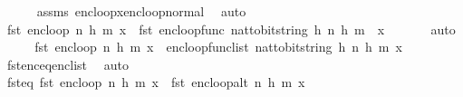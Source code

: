 \begin{isabellebody}
\ \ \ \ \isamarkupfalse%
\ assms\ enc{\isacharunderscore}{\kern0pt}loop{\isacharunderscore}{\kern0pt}x{\isacharunderscore}{\kern0pt}enc{\isacharunderscore}{\kern0pt}loop{\isacharunderscore}{\kern0pt}normal\ \isamarkupfalse%
\ auto\isanewline
\isanewline
\ \ \isamarkupfalse%
\ {\isachardoublequoteopen}fst\ {\isacharparenleft}{\kern0pt}enc{\isacharunderscore}{\kern0pt}loop\ {\isacharparenleft}{\kern0pt}n{\isacharcomma}{\kern0pt}\ h{\isacharcomma}{\kern0pt}\ m{\isacharparenright}{\kern0pt}\ x{\isacharparenright}{\kern0pt}\ {\isacharequal}{\kern0pt}\ fst\ {\isacharparenleft}{\kern0pt}enc{\isacharunderscore}{\kern0pt}loop{\isacharunderscore}{\kern0pt}func\ {\isacharparenleft}{\kern0pt}nat{\isacharunderscore}{\kern0pt}to{\isacharunderscore}{\kern0pt}bitstring\ h{\isacharcomma}{\kern0pt}\ n{\isacharcomma}{\kern0pt}\ h{\isacharcomma}{\kern0pt}\ m{\isacharparenright}{\kern0pt}\ {\isacharbrackleft}{\kern0pt}{\isacharbrackright}{\kern0pt}\ x{\isacharparenright}{\kern0pt}{\isachardoublequoteclose}\ \isanewline
\ \ \ \ \isamarkupfalse%
\ auto\isanewline
\ \ \isamarkupfalse%
\ \isamarkupfalse%
\ {\isachardoublequoteopen}fst\ {\isacharparenleft}{\kern0pt}enc{\isacharunderscore}{\kern0pt}loop\ {\isacharparenleft}{\kern0pt}n{\isacharcomma}{\kern0pt}\ h{\isacharcomma}{\kern0pt}\ m{\isacharparenright}{\kern0pt}\ x{\isacharparenright}{\kern0pt}\ {\isacharequal}{\kern0pt}\ enc{\isacharunderscore}{\kern0pt}loop{\isacharunderscore}{\kern0pt}func{\isacharunderscore}{\kern0pt}list\ {\isacharparenleft}{\kern0pt}nat{\isacharunderscore}{\kern0pt}to{\isacharunderscore}{\kern0pt}bitstring\ h{\isacharcomma}{\kern0pt}\ n{\isacharcomma}{\kern0pt}\ h{\isacharcomma}{\kern0pt}\ m{\isacharparenright}{\kern0pt}\ x{\isachardoublequoteclose}\isanewline
\ \ \ \ \isamarkupfalse%
\ fst{\isacharunderscore}{\kern0pt}enc{\isacharunderscore}{\kern0pt}eq{\isacharunderscore}{\kern0pt}enc{\isacharunderscore}{\kern0pt}list\ \isamarkupfalse%
\ auto\isanewline
\ \ \isamarkupfalse%
\ \isamarkupfalse%
\ fst{\isacharunderscore}{\kern0pt}eq{\isacharcolon}{\kern0pt}\ {\isachardoublequoteopen}fst\ {\isacharparenleft}{\kern0pt}enc{\isacharunderscore}{\kern0pt}loop\ {\isacharparenleft}{\kern0pt}n{\isacharcomma}{\kern0pt}\ h{\isacharcomma}{\kern0pt}\ m{\isacharparenright}{\kern0pt}\ x{\isacharparenright}{\kern0pt}\ {\isacharequal}{\kern0pt}\ fst\ {\isacharparenleft}{\kern0pt}enc{\isacharunderscore}{\kern0pt}loop{\isacharunderscore}{\kern0pt}alt\ {\isacharparenleft}{\kern0pt}n{\isacharcomma}{\kern0pt}\ h{\isacharcomma}{\kern0pt}\ m{\isacharparenright}{\kern0pt}\ x{\isacharparenright}{\kern0pt}{\isachardoublequoteclose}\ \isamarkupfalse%

\end{isabellebody}
